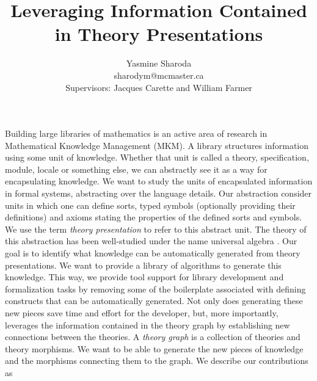 \documentclass[a4paper]{article}
\begin{document}
\title{Leveraging Information Contained \\ in Theory Presentations}
\author{Yasmine Sharoda \\ sharodym@mcmaster.ca \\[0.3cm] Supervisors: Jacques 
	Carette and William Farmer}
\maketitle
Building large libraries of mathematics is an active area of research in Mathematical Knowledge 
Management (MKM). A library structures information using some unit of knowledge. Whether that unit 
is called a theory, specification, module, locale or something else, we can abstractly see it as a way for 
encapsulating knowledge. 
We want to study the units of encapsulated information in formal systems, abstracting over the 
language details. Our abstraction consider units in which one can define sorts, typed symbols 
(optionally providing their definitions) and axioms stating the properties of the defined sorts and 
symbols. We use the term \textit{theory presentation} to refer to this abstract unit. The theory of this 
abstraction has been well-studied under the name universal algebra \cite{wechler1992universal}. Our 
goal is to identify what knowledge can be automatically generated from theory presentations. We want 
to provide a library of 
algorithms to generate this knowledge. This way, we provide tool support for library development and 
formalization tasks by removing some of the boilerplate associated with defining constructs that can 
be automatically generated. Not only does generating these new pieces save time and effort for the 
developer, but, more importantly, leverages the information contained in the theory graph by 
establishing new connections between the theories. A \textit{theory graph} is a collection of theories 
and 
theory morphisms. We want to be able to generate the new pieces of knowledge and the morphisms 
connecting them to the graph. We describe our contributions as 
\end{document}
